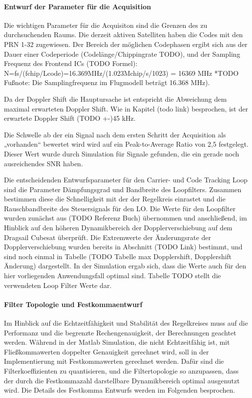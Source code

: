 \paragraph{Entwurf der Parameter für die Acquisition}
Die wichtigen Parameter für die Acquisiton sind die Grenzen des zu durchsuchenden Raums.
Die derzeit aktiven Satelliten haben die Codes mit den PRN 1-32 zugewiesen. Der Bereich der möglichen Codephasen ergibt sich aus der Dauer einer Codeperiode (Codelänge/Chippingrate TODO), und der Sampling Frequenz des Frontend ICs (TODO Formel): N=fs/(fchip/Lcode)=16.369MHz/(1.023Mchip/s/1023) = 16369 MHz *TODO Fußnote: Die Samplingfrequenz im Flugmodell beträgt 16.368 MHz).

Da der Doppler Shift die Hauptursache ist entspricht die Abweichung dem maximal erwarteten Doppler Shift. Wie in Kapitel (todo link) besprochen, ist der erwartete Doppler Shift (TODO +-)45 kHz.

Die Schwelle ab der ein Signal nach dem ersten Schritt der Acquisition als „vorhanden“ bewertet wird wird auf ein Peak-to-Average Ratio von 2,5 festgelegt. Dieser Wert wurde durch Simulation für Signale gefunden, die ein gerade noch ausreichendes SNR haben.




Die entscheidenden Entwurfsparameter für den Carrier- und Code Tracking Loop sind die Parameter Dämpfungsgrad und Bandbreite des Loopfilters. Zusammen bestimmen diese die Schnelligkeit mit der der Regelkreis einrastet und die Rauschbandbreite des Steuersignals für den LO.
Die Werte für den Loopfilter wurden zunächst aus (TODO Referenz Buch) übernommen und anschließend, im Hinblick auf den höheren Dynamikbereich der Dopplerverschiebung auf dem Dragsail Cubesat überprüft. Die Extremwerte der Änderungsrate der Dopplerverschiebung wurden bereits in Abschnitt (TODO Link) bestimmt, und sind noch einmal in Tabelle (TODO Tabelle max Dopplershift, Dopplershift Änderung) dargestellt.
In der Simulation ergab sich, dass die Werte auch für den hier vorliegenden Anwendungsfall optimal sind. Tabelle TODO stellt die verwendeten Loop Filter Werte dar.

\paragraph{Filter Topologie und Festkommaentwurf}
Im Hinblick auf die Echtzeitfähigkeit und Stabilität des Regelkreises muss auf die Performanz und die begrenzte Rechengenauigkeit, der Berechnungen geachtet werden. Während in der Matlab Simulation, die nicht Echtzeitfähig ist, mit Fließkommawerten doppelter Genauigkeit gerechnet wird, soll in der Implementierung mit Festkommawerten gerechnet werden.
Dafür sind die Filterkoeffizienten zu quantisieren, und die Filtertopologie so anzupassen, dass der durch die Festkommazahl darstellbare Dynamikbereich optimal ausgenutzt wird. Die Details des Festkomma Entwurfs werden im Folgenden besprochen.

